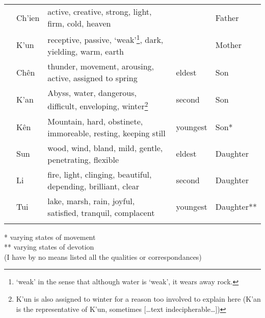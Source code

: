 \documentclass[11pt]{book}
\newcommand{\trigram}[1]{{\dejavusans\char\numexpr"2630+#1}}
\begin{document}
\begin{longtable}[]{@{}
  >{\raggedright\arraybackslash}p{}
  >{\centering\arraybackslash}p{}
  >{\raggedright\arraybackslash}p{}
  >{\raggedright\arraybackslash}p{}
  >{\raggedleft\arraybackslash}p{}@{}}
\toprule
\endhead
\trigram{0} & Ch'ien & active, creative, strong, light, firm, cold, heaven & & Father \\
\trigram{7} & K'un & receptive, passive, `weak'\footnote{`weak' in the sense that although water is `weak', it wears away rock.}, dark, yielding, warm, earth & & Mother \\
\trigram{3} & Chên & thunder, movement, arousing, active, assigned to spring & eldest & Son \\
\trigram{5} & K'an & Abyss, water, dangerous, difficult, enveloping, winter\footnote{K'un is also assigned to winter for a reason too involved to explain here (K'an is the representative of K'un, sometimes {[}\ldots text indecipherable\ldots{]})} & second & Son \\
\trigram{6} & Kên & Mountain, hard, obstinete, immoreable, resting, keeping still & youngest & Son* \\
\trigram{4} & Sun & wood, wind, bland, mild, gentle, penetrating, flexible & eldest & Daughter \\
\trigram{2} & Li & fire, light, clinging, beautiful, depending, brilliant, clear & second & Daughter \\
\trigram{1} & Tui & lake, marsh, rain, joyful, satisfied, tranquil, complacent & youngest & Daughter** \\
\bottomrule
\label{table:trigrams}
\end{longtable}

* varying states of movement\\
** varying states of devotion\\
(I have by no means listed all the qualities or correspondances)
\end{document}
